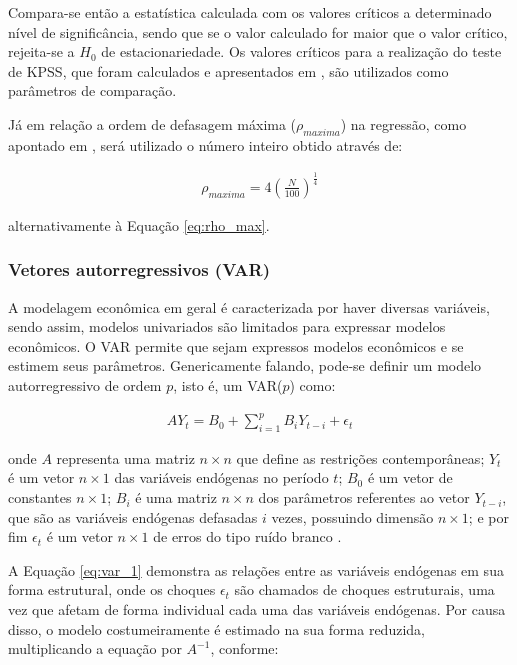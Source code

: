 Compara-se então a estatística calculada com os valores críticos a determinado nível de significância, sendo que se o valor calculado for maior que o valor crítico, rejeita-se a $H_{0}$ de estacionariedade. Os valores críticos para a realização do teste de KPSS, que foram calculados e apresentados em , são utilizados como parâmetros de comparação.

Já em relação a ordem de defasagem máxima ($\rho_{maxima}$) na regressão, como apontado em , será utilizado o número inteiro obtido através de:

\begin{ceqn}
\begin{align} \label{eq:rho_max_kpss}
\rho_{maxima} = 4 \left( \frac{N}{100} \right)^\frac{1}{4}
\end{align}
\end{ceqn} alternativamente à Equação \eqref{eq:rho_max}.

\subsubsection{Vetores autorregressivos (VAR)}

A modelagem econômica em geral é caracterizada por haver diversas variáveis, sendo assim, modelos univariados são limitados para expressar modelos econômicos. O VAR permite que sejam expressos modelos econômicos e se estimem seus parâmetros. Genericamente falando, pode-se definir um modelo autorregressivo de ordem $p$, isto é, um VAR($p$) como:

\begin{ceqn}
\begin{align} \label{eq:var_1}
A Y_{t} = B_{0} + \sum_{i=1}^{p}{B_{i} Y_{t-i}} + \epsilon_{t}
\end{align}
\end{ceqn} onde $A$ representa uma matriz $n \times n$ que define as restrições contemporâneas; $Y_{t}$ é um vetor $n \times 1$ das variáveis endógenas no período $t$; $B_{0}$ é um vetor de constantes $n \times 1$; $B_{i}$ é uma matriz $n \times n$ dos parâmetros referentes ao vetor $Y_{t-i}$, que são as variáveis endógenas defasadas $i$ vezes, possuindo dimensão $n \times 1$; e por fim $\epsilon_{t}$ é um vetor $n \times 1$ de erros do tipo ruído branco \cite{bueno2008}.

A Equação \eqref{eq:var_1} demonstra as relações entre as variáveis endógenas em sua forma estrutural, onde os choques $\epsilon_{t}$ são chamados de choques estruturais, uma vez que afetam de forma individual cada uma das variáveis endógenas. Por causa disso, o modelo costumeiramente é estimado na sua forma reduzida, multiplicando a equação por $A^{-1}$, conforme:

